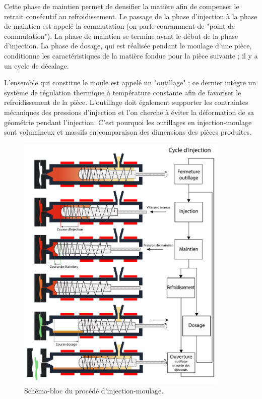 Cette phase de maintien permet de densifier la matière afin de compenser le retrait consécutif au refroidissement.
Le passage de la phase d'injection à la phase de maintien est appelé la commutation (on parle couramment de "point de commutation").
La phase de maintien se termine avant le début de la phase d'injection.
La phase de dosage, qui est réalisée pendant le moulage d'une pièce, conditionne les caractéristiques de la matière fondue pour la pièce suivante ; il y a un cycle de décalage.

L'ensemble qui constitue le moule est appelé un "outillage" ; ce dernier intègre un système de régulation thermique à température constante afin de favoriser le refroidissement de la pièce.
L'outillage doit également supporter les contraintes mécaniques des pressions d'injection et l'on cherche à éviter la déformation de sa géométrie pendant l'injection.
C'est pourquoi les outillages en injection-moulage sont volumineux et massifs en comparaison des dimensions des pièces produites.

\begin{figure}[hbtp]
	\centering
	\includegraphics[width=0.9\textwidth,height=\textheight,keepaspectratio]{../Chap1/Figures/SAPRISTI_Schema-cycle.pdf}
	\caption{Schéma-bloc du procédé d'injection-moulage.}
	\label{fig:cycle_injection}
\end{figure}

